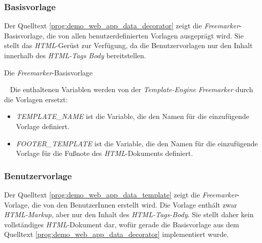 \subsubsection{Basisvorlage}
Der Quelltext \ref{prog:demo_web_app_data_decorator} zeigt die \emph{Freemarker}-Basisvorlage, die von allen benutzerdefinierten Vorlagen ausgeprägt wird. Sie stellt das \emph{HTML}-Gerüst zur Verfügung, da die Benutzervorlagen nur den Inhalt innerhalb des \emph{HTML-Tags Body} bereitstellen.
\begin{program}[h]
\caption{Die \emph{Freemarker}-Basisvorlage}
\label{prog:demo_web_app_data_decorator}
\end{program}
\ \newline
Die enthaltenen Variablen werden von der \emph{Template-Engine} \emph{Freemarker} durch die Vorlagen ersetzt:
\begin{itemize}
	\item\emph{TEMPLATE\_NAME} ist die Variable, die den Namen für die einzufügende Vorlage definiert.
	\item\emph{FOOTER\_TEMPLATE} ist die Variable, die den Namen für die einzufügende Vorlage für die Fußnote des \emph{HTML}-Dokuments definiert.
\end{itemize}

\subsubsection{Benutzervorlage}
Der Quelltext \ref{prog:demo_web_app_data_template} zeigt die \emph{Freemarker}-Vorlage, die von den BenutzerInnen erstellt wird. Die Vorlage enthält zwar \emph{HTML-Markup}, aber nur den Inhalt des \emph{HTML-Tags-Body}. Sie stellt daher kein vollständiges \emph{HTML}-Dokument dar, wofür gerade die Basisvorlage aus dem Quelltext \ref{prog:demo_web_app_data_decorator} implementiert wurde.
\newpage

